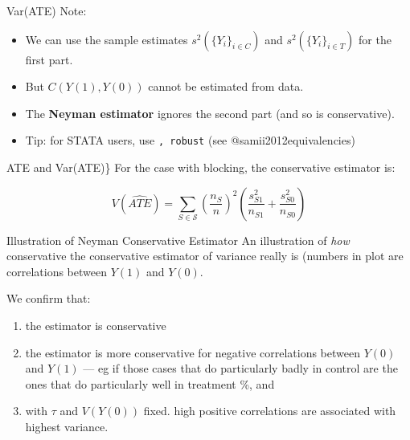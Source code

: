 \documentclass[
  11pt,
  ignorenonframetext,
]{beamer}
\providecommand{\tightlist}{%
  \setlength{\itemsep}{0pt}\setlength{\parskip}{0pt}}\usepackage{longtable,booktabs,array}
\begin{document}
\begin{frame}[fragile]{Var(ATE)}
\protect\hypertarget{varate-3}{}
Note:

\begin{itemize}
\tightlist
\item
  We can use the sample estimates \(s^2(\{Y_i\}_{i \in C})\) and
  \(s^2(\{Y_i\}_{i \in T})\) for the first part.
\item
  But \(C(Y(1),Y(0))\) cannot be estimated from data.
\item
  The \textbf{Neyman estimator} ignores the second part (and so is
  conservative).
\item
  Tip: for STATA users, use \texttt{,\ robust} (see
  @samii2012equivalencies)
\end{itemize}
\end{frame}

\begin{frame}{ATE and Var(ATE)\}}
\protect\hypertarget{ate-and-varate}{}
For the case with blocking, the conservative estimator is:

\begin{equation*} V(\widehat{ATE})   = {\sum_{S\in \mathcal{S}}{\left(\frac{n_{S}}{n}\right)^2} \left({\frac{s^2_{S1}}{n_{S1}}} + {\frac{s^2_{S0}}{n_{S0}}} \right)}  \end{equation*}
\end{frame}

\begin{frame}{Illustration of Neyman Conservative Estimator}
\protect\hypertarget{illustration-of-neyman-conservative-estimator}{}
An illustration of \textit{how} conservative the conservative estimator
of variance really is (numbers in plot are correlations between \(Y(1)\)
and \(Y(0)\).

We confirm that:

\begin{enumerate}
\tightlist
\item
  the estimator is conservative
\item
  the estimator is more conservative for negative correlations between
  \(Y(0)\) and \(Y(1)\) --- eg if those cases that do particularly badly
  in control are the ones that do particularly well in treatment \%, and
\item
  with \(\tau\) and \(V(Y(0))\) fixed. high positive correlations are
  associated with highest variance.
\end{enumerate}
\end{frame}
\end{document}
